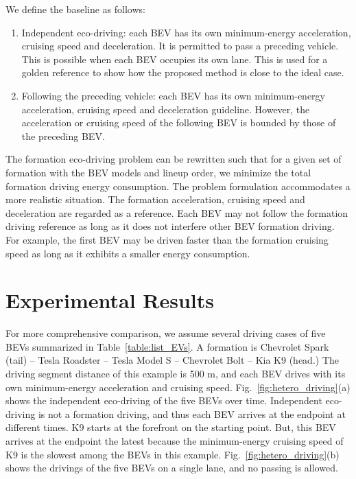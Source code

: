 \documentclass{IEEEtran}
\begin{document}
We define the baseline as follows:
\begin{enumerate}
\item Independent eco-driving: each BEV has its own minimum-energy acceleration, cruising speed and deceleration. 
It is permitted to pass a preceding vehicle. This is possible when each BEV occupies its own lane. This is used for a golden reference to show how the proposed method is close to the ideal case.
\item Following the preceding vehicle: each BEV has its own minimum-energy acceleration, cruising speed and deceleration guideline. However, the acceleration or cruising speed of the following BEV is bounded by those of the preceding BEV.
\end{enumerate}

The formation eco-driving problem can be rewritten such that for a given set of formation with the BEV models and lineup order, we minimize the total formation driving energy consumption.
The problem formulation accommodates a more realistic situation. The formation acceleration, cruising speed and deceleration are regarded as a reference. Each BEV may not follow the formation driving reference as long as it does not interfere other BEV formation driving. For example, the first BEV may be driven faster than the formation cruising speed as long as it exhibits a smaller energy consumption.

\section{Experimental Results}\label{sec:exp}



For more comprehensive comparison, we assume several driving cases of five BEVs summarized in Table~\ref{table:list_EVs}. A formation is Chevrolet Spark (tail) -- Tesla Roadster -- Tesla Model S -- Chevrolet Bolt -- Kia K9 (head.)
The driving segment distance of this example is 500 m, and each BEV drives with its own minimum-energy acceleration and cruising speed. 
Fig.~\ref{fig:hetero_driving}(a) shows the independent eco-driving of the five BEVs over time. Independent eco-driving is not a formation driving, and thus each BEV arrives at the endpoint at different times.
K9 starts at the forefront on the starting point. But, this BEV arrives at the endpoint the latest because the minimum-energy cruising speed of K9 is the slowest among the BEVs in this example. 
Fig.~\ref{fig:hetero_driving}(b) shows the drivings of the five BEVs on a single lane, and no passing is allowed. 
\end{document}
